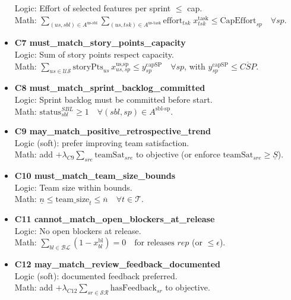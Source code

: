 \documentclass[11pt,a4paper]{article}
\begin{document}
\begin{itemize}
  Logic: Effort of selected features per sprint $\le$ cap.\\
  Math: $\sum_{(us,sbl)\in A^{\text{us-sbl}}}\sum_{(us,tsk)\in A^{\text{us-task}}}\text{effort}_{tsk}\; x^{\text{task}}_{tsk} \le \text{CapEffort}_{sp}\quad \forall sp$.
  \item \textbf{C7 must\_match\_story\_points\_capacity}\\
  Logic: Sum of story points respect capacity.\\
  Math: $\sum_{us\in\mathcal{US}} \text{storyPts}_{us}\, x^{\text{us,sp}}_{us,sp} \le y^{\text{capSP}}_{sp}\quad \forall sp$, with $y^{\text{capSP}}_{sp}\le \overline{CSP}$.
  \item \textbf{C8 must\_match\_sprint\_backlog\_committed}\\
  Logic: Sprint backlog must be committed before start.\\
  Math: $\text{status}^{SBL}_{sbl}\ge 1 \quad \forall (sbl,sp)\in A^{\text{sbl-sp}}$.
  \item \textbf{C9 may\_match\_positive\_retrospective\_trend}\\
  Logic (soft): prefer improving team satisfaction.\\
  Math: add $+\lambda_{C9}\sum_{sre}\text{teamSat}_{sre}$ to objective (or enforce $\text{teamSat}_{sre}\ge \underline{S}$).
  \item \textbf{C10 must\_match\_team\_size\_bounds}\\
  Logic: Team size within bounds.\\
  Math: $\underline{n}\le \text{team\_size}_t \le \overline{n}\quad \forall t\in\mathcal{T}$.
  \item \textbf{C11 cannot\_match\_open\_blockers\_at\_release}\\
  Logic: No open blockers at release.\\
  Math: $\sum_{bl\in\mathcal{BL}} (1- x^{\text{bl}}_{bl}) = 0 \quad \text{for releases }rep$ (or $\le \epsilon$).
  \item \textbf{C12 may\_match\_review\_feedback\_documented}\\
  Logic (soft): documented feedback preferred.\\
  Math: add $+\lambda_{C12}\sum_{sr\in\mathcal{SR}}\text{hasFeedback}_{sr}$ to objective.
\end{itemize}
\end{document}
